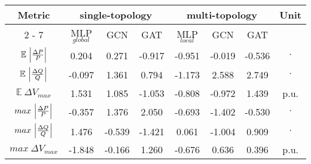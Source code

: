 \makegapedcells\begin{tabular}{|c||c|c|c||c|c|c||c|}%
                   \hline%
                   \multirow{2}{*}{Metric} & \multicolumn{3}{c||}{single{-}topology} & \multicolumn{3}{c||}{multi{-}topology}& \multirow{2}{*}{Unit}\\%
                   \cline{2%
                   -%
                   7}%
                   & MLP$_{global}$ & GCN      & GAT      & MLP$_{local}$ & GCN      & GAT      &         \\%
                   \hline%
                   $\mathbb{E} \ \Bigl|\frac{\Delta P}{P}\Bigr|$ & 0.204          & 0.271    & {-}0.917 & {-}0.951      & {-}0.019& {-}0.536& $\cdot$\\%
                   \hline%
                   $\mathbb{E} \ \Bigl|\frac{\Delta Q}{Q}\Bigr|$ & {-}0.097       & 1.361    & 0.794    & {-}1.173      & 2.588& 2.749& $\cdot$\\%
                   \hline%
                   $\mathbb{E} \ \Delta V_{max}$                 & 1.531          & 1.085    & {-}1.053 & {-}0.808      & {-}0.972 & 1.439    & p.u.    \\%
                   \hline%
                   $max \ \Bigl|\frac{\Delta P}{P}\Bigr|$        & {-}0.357       & 1.376    & 2.050    & {-}0.693      & {-}1.402 & {-}0.530& $\cdot$\\%
                   \hline%
                   $max \ \Bigl|\frac{\Delta Q}{Q}\Bigr|$        & 1.476          & {-}0.539 & {-}1.421 & 0.061         & {-}1.004 & 0.909& $\cdot$\\%
                   \hline%
                   $max \ \Delta V_{max}$                        & {-}1.848       & {-}0.166 & 1.260    & {-}0.676      & 0.636    & 0.396    & p.u.    \\%
                   \hline%
\end{tabular}